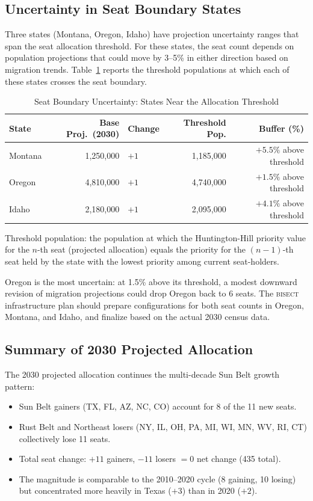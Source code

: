 \subsection{Uncertainty in Seat Boundary States}

Three states (Montana, Oregon, Idaho) have projection uncertainty ranges that span
the seat allocation threshold. For these states, the seat count depends on population
projections that could move by 3--5\% in either direction based on migration trends.
Table~\ref{tab:uncertain} reports the threshold populations at which each of these
states crosses the seat boundary.

\begin{table}[ht]
\centering
\caption{Seat Boundary Uncertainty: States Near the Allocation Threshold}
\label{tab:uncertain}
\begin{tabular}{lrlrr}
\toprule
State & Base Proj.\ (2030) & Change & Threshold Pop. & Buffer (\%) \\
\midrule
Montana & 1,250,000 & $+1$ & 1,185,000 & $+5.5\%$ above threshold \\
Oregon & 4,810,000 & $+1$ & 4,740,000 & $+1.5\%$ above threshold \\
Idaho & 2,180,000 & $+1$ & 2,095,000 & $+4.1\%$ above threshold \\
\bottomrule
\end{tabular}
\begin{tablenotes}
\small
\item Threshold population: the population at which the Huntington-Hill priority value
  for the $n$-th seat (projected allocation) equals the priority for the $(n-1)$-th
  seat held by the state with the lowest priority among current seat-holders.
\end{tablenotes}
\end{table}

Oregon is the most uncertain: at 1.5\% above its threshold, a modest downward revision
of migration projections could drop Oregon back to 6 seats. The \textsc{bisect}
infrastructure plan should prepare configurations for both seat counts in Oregon,
Montana, and Idaho, and finalize based on the actual 2030 census data.

\subsection{Summary of 2030 Projected Allocation}

The 2030 projected allocation continues the multi-decade Sun Belt growth pattern:
\begin{itemize}
\item Sun Belt gainers (TX, FL, AZ, NC, CO) account for 8 of the 11 new seats.
\item Rust Belt and Northeast losers (NY, IL, OH, PA, MI, WI, MN, WV, RI, CT)
  collectively lose 11 seats.
\item Total seat change: $+11$ gainers, $-11$ losers $= 0$ net change (435 total).
\item The magnitude is comparable to the 2010--2020 cycle (8 gaining, 10 losing)
  but concentrated more heavily in Texas ($+3$) than in 2020 ($+2$).
\end{itemize}
